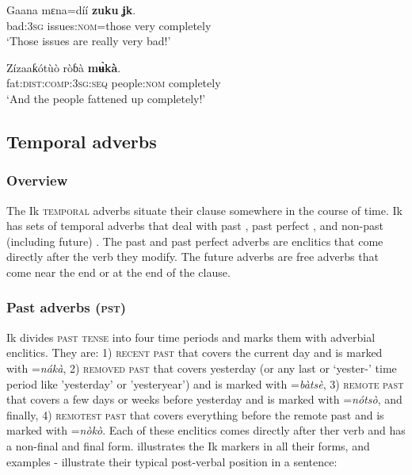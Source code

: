 \ea\label{ex:adv:1}
\gll Gaana   mɛna=díí     \textbf{zuku}   \textbf{ʝ{\Í}k\ᶤ}. \\
bad:\textsc{3sg}   issues:\textsc{nom}=those   very   completely    \\
\glt ‘Those issues are really very bad!’ 
\z




\ea\label{ex:adv:2}
\gll Zízaaƙótùò       ròɓà     \textbf{m\`{ʉ}kà}. \\
fat:\textsc{dist:comp:3sg:seq}   people:\textsc{nom}   completely    \\
\glt ‘And the people fattened up completely!’ 
\z






\subsection{Temporal adverbs}\label{sec:9.3}
\subsubsection{Overview}\label{sec:9.3.1}

The Ik \textsc{temporal} adverbs situate their clause somewhere in the course of time. Ik has sets of temporal adverbs that deal with past , past perfect , and non-past (including future) . The past and past perfect  adverbs are enclitics that come directly after the verb they modify. The future  adverbs are free adverbs that come near the end or at the end of the clause. 


\subsubsection{Past  adverbs (\textsc{pst})}\label{sec:9.3.2}

Ik divides \textsc{past tense} into four time periods and marks them with adverbial enclitics. They are: 1) \textsc{recent past} that covers the current day and is marked with =\textit{nákà}, 2) \textsc{removed past} that covers yesterday (or any last or ‘yester-’ time period like 'yesterday' or 'yesteryear') and is marked with =\textit{bàtsè}, 3) \textsc{remote past} that covers a few days or weeks before yesterday and is marked with =\textit{nótsò}, and finally, 4) \textsc{remotest past} that covers everything before the remote past and is marked with =\textit{nòkò}. Each of these  enclitics comes directly after ther verb and has a non-final and final form.  illustrates the Ik  markers in all their forms, and examples - illustrate their typical post-verbal position in a sentence:


